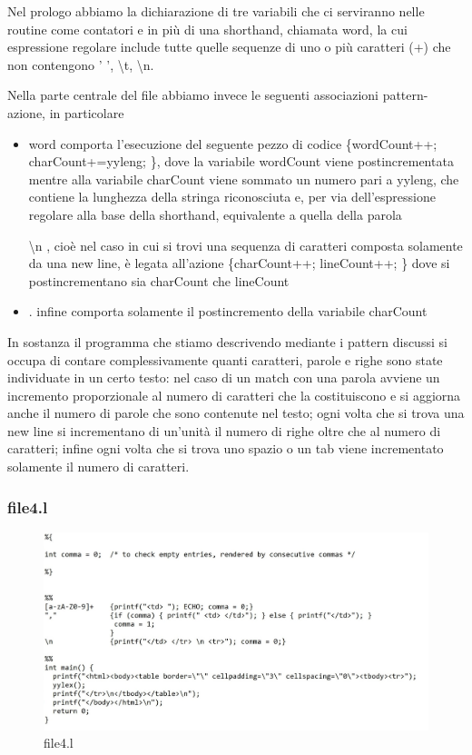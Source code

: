 \documentclass[class=book, crop=false, oneside, 12pt]{standalone}
\begin{document}
Nel prologo abbiamo la dichiarazione di tre variabili che ci serviranno nelle routine come contatori e in più di una shorthand, chiamata word, la cui espressione regolare include tutte quelle sequenze di uno o più caratteri (+) che non contengono ' ', \textbackslash t, \textbackslash n.

Nella parte centrale del file abbiamo invece le seguenti associazioni pattern-azione, in particolare

\begin{itemize}
    \item word comporta l'esecuzione del seguente pezzo di codice \{wordCount++; charCount+=yyleng; \}, dove la variabile wordCount viene postincrementata mentre alla variabile charCount viene sommato un numero pari a yyleng, che contiene la lunghezza della stringa riconosciuta e, per via dell'espressione regolare alla base della shorthand, equivalente a quella della parola
    \item [\textbackslash n], cioè nel caso in cui si trovi una sequenza di caratteri composta solamente da una new line, è legata all'azione \{charCount++; lineCount++; \} dove si postincrementano sia charCount che lineCount
    \item . infine comporta solamente il postincremento della variabile charCount
\end{itemize}

In sostanza il programma che stiamo descrivendo mediante i pattern discussi si occupa di contare complessivamente quanti caratteri, parole e righe sono state individuate in un certo testo: nel caso di un match con una parola avviene un incremento proporzionale al numero di caratteri che la costituiscono e si aggiorna anche il numero di parole che sono contenute nel testo; ogni volta che si trova una new line si incrementano di un'unità il numero di righe oltre che al numero di caratteri; infine ogni volta che si trova uno spazio o un tab viene incrementato solamente il numero di caratteri. 

\subsubsection{file4.l}

\begin{figure}[h]
    \centering
    \includegraphics[width=.7\textwidth,keepaspectratio]{file4.l.jpg}
    \caption{file4.l}
    \label{file4.l}
\end{figure}
\end{document}
